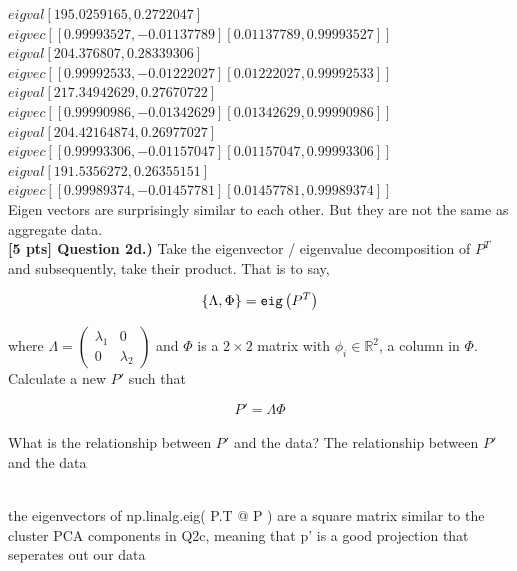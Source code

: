 \documentclass[paper=a4, fontsize=11pt]{scrartcl} %
\begin{document}
$eigval [195.0259165, 0.2722047]$  \\
$eigvec [[ 0.99993527, -0.01137789][ 0.01137789, 0.99993527]]$ \\
$eigval [204.376807, 0.28339306] $ \\
$eigvec [[ 0.99992533, -0.01222027][ 0.01222027, 0.99992533]]$ \\
$eigval [217.34942629, 0.27670722]$  \\
$eigvec [[ 0.99990986, -0.01342629][ 0.01342629, 0.99990986]]$ \\
$eigval [204.42164874, 0.26977027]$ \\
$eigvec [[ 0.99993306, -0.01157047][ 0.01157047, 0.99993306]]$ \\
$eigval [191.5356272, 0.26355151]$ \\
$eigvec [[ 0.99989374, -0.01457781][ 0.01457781, 0.99989374]]$ \\
Eigen vectors are surprisingly similar to each other. But they are not the same as aggregate data. \\

\textbf{[5 pts] Question 2d.)}
Take the eigenvector / eigenvalue decomposition of $P^T$ and subsequently, take their product. That is to say, 

\begin{equation}
    \{\Lambda, \Phi\} = \verb"eig"\left( P^T \right)
    \nonumber
\end{equation}

where $\Lambda = \left( \begin{matrix} \lambda_1 & 0 \\ 0 & \lambda_2 \end{matrix} \right)$ and $\Phi$ is a $2 \times 2$ matrix with $\phi_i \in \mathbb{R}^2$, a column in $\Phi$. Calculate a new $P'$ such that

\begin{equation}
    P' = \Lambda \Phi \nonumber
\end{equation}
\\
What is the relationship between $P'$ and the data? 
The relationship between $P'$ and the data 

\\
the eigenvectors of np.linalg.eig( P.T @ P ) are a square matrix similar to the cluster PCA components in Q2c, meaning that p' is a good projection that seperates out our data\\


\vspace{10mm}
\end{document}
